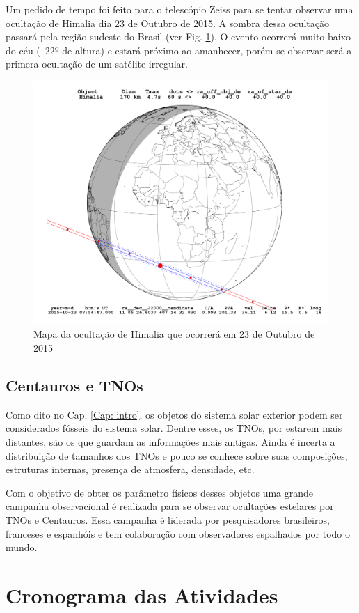 \documentclass[12pt,a4paper]{monografia}
\begin{document}
Um pedido de tempo foi feito para o telescópio Zeiss para se tentar observar uma ocultação de Himalia  dia 23 de Outubro de 2015. A sombra dessa ocultação passará pela região sudeste do Brasil (ver Fig. \ref{Fig: occ-Himalia-itajuba}). O evento ocorrerá muito baixo do céu (~22º de altura) e estará próximo ao amanhecer, porém se observar será a primera ocultação de um satélite irregular.

\begin{figure}
\includegraphics[scale=0.35]{figuras/Himalia_2015-10-23T07:54:47.png}
\caption{Mapa da ocultação de Himalia que ocorrerá em 23 de Outubro de 2015}
\label{Fig: occ-Himalia-itajuba}
\end{figure}


\section{Centauros e TNOs}
\label{Sec: TNO-occ}

\indent \indent Como dito no Cap. \ref{Cap: intro}, os objetos do sistema solar exterior podem ser considerados fósseis do sistema solar. Dentre esses, os TNOs, por estarem mais distantes, são os que guardam as informações mais antigas. Ainda é incerta a distribuição de tamanhos dos TNOs e pouco se conhece sobre suas composições, estruturas internas, presença de atmosfera, densidade, etc.

Com o objetivo de obter os parâmetro físicos desses objetos uma grande campanha observacional é realizada para se observar ocultações estelares por TNOs e Centauros. Essa campanha é liderada por pesquisadores brasileiros, franceses e espanhóis e tem colaboração com observadores espalhados por todo o mundo.




\chapter{Cronograma das Atividades}
\label{Cap: cronograma}

\glsaddall
\printglossary




\end{document}
